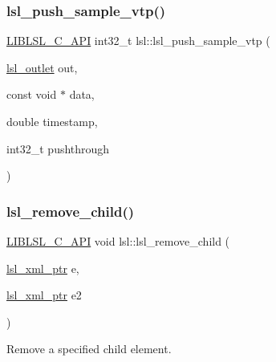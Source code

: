 \mbox{\label{namespacelsl_a750c5759d30e4e0a47223c7048bfa4ca}} 
\subsubsection{\texorpdfstring{lsl\+\_\+push\+\_\+sample\+\_\+vtp()}{lsl\_push\_sample\_vtp()}}
{\footnotesize\ttfamily \hyperlink{lsl__cpp_8h_aafd0ef1813e8be84a1420c4f1df64615}{L\+I\+B\+L\+S\+L\+\_\+\+C\+\_\+\+A\+PI} int32\+\_\+t lsl\+::lsl\+\_\+push\+\_\+sample\+\_\+vtp (\begin{DoxyParamCaption}\item[{\hyperlink{namespacelsl_abcf512b0f66dacf86c10b165995fd50b}{lsl\+\_\+outlet}}]{out,  }\item[{const void $\ast$}]{data,  }\item[{double}]{timestamp,  }\item[{int32\+\_\+t}]{pushthrough }\end{DoxyParamCaption})}

\mbox{\label{namespacelsl_ad367e1e282a1fa614f44caaf113cf39c}} 
\subsubsection{\texorpdfstring{lsl\+\_\+remove\+\_\+child()}{lsl\_remove\_child()}}
{\footnotesize\ttfamily \hyperlink{lsl__cpp_8h_aafd0ef1813e8be84a1420c4f1df64615}{L\+I\+B\+L\+S\+L\+\_\+\+C\+\_\+\+A\+PI} void lsl\+::lsl\+\_\+remove\+\_\+child (\begin{DoxyParamCaption}\item[{\hyperlink{namespacelsl_a5edc7a49a1a1be1634fe6dce3d59c59b}{lsl\+\_\+xml\+\_\+ptr}}]{e,  }\item[{\hyperlink{namespacelsl_a5edc7a49a1a1be1634fe6dce3d59c59b}{lsl\+\_\+xml\+\_\+ptr}}]{e2 }\end{DoxyParamCaption})}

Remove a specified child element. \mbox{\label{namespacelsl_a1a946a99964cbd500165fbd5f3d33766}} 
